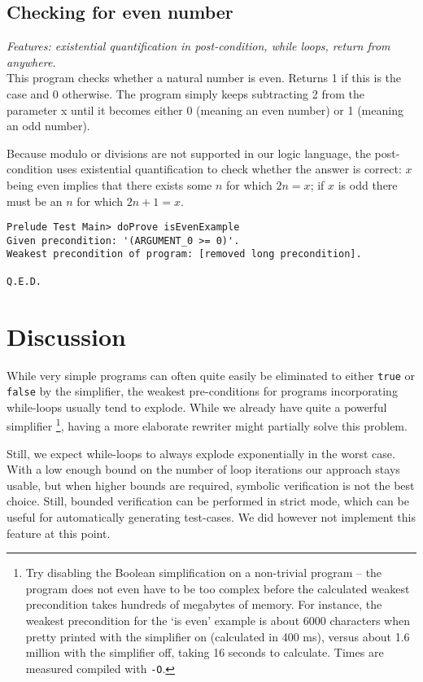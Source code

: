 \documentclass[a4paper]{article}
\begin{document}
\subsection{Checking for even number}
\textit{Features: existential quantification in post-condition, while loops, return from anywhere.}\\
This program checks whether a natural number is even. Returns 1 if this is the case and 0 otherwise. The program simply keeps subtracting 2 from the parameter x until it becomes either 0 (meaning an even number) or 1 (meaning an odd number).

Because modulo or divisions are not supported in our logic language, the post-condition uses existential quantification to check whether the answer is correct: $x$ being even implies that there exists some $n$ for which $2n = x$; if $x$ is odd there must be an $n$ for which $2n + 1 = x$.

\begin{verbatim}
Prelude Test Main> doProve isEvenExample
Given precondition: '(ARGUMENT_0 >= 0)'.
Weakest precondition of program: [removed long precondition].

Q.E.D.
\end{verbatim}

\section{Discussion}
While very simple programs can often quite easily be eliminated to either \texttt{true} or \texttt{false} by the simplifier, the weakest pre-conditions for programs incorporating while-loops usually tend to explode. While we already have quite a powerful simplifier \footnote{Try disabling the Boolean simplification on a non-trivial program -- the program does not even have to be too complex before the calculated weakest precondition takes hundreds of megabytes of memory. For instance, the weakest precondition for the `is even' example is about 6000 characters when pretty printed with the simplifier on (calculated in 400 ms), versus about 1.6 million with the simplifier off, taking 16 seconds to calculate. Times are measured compiled with \texttt{-O}.}, having a more elaborate rewriter might partially solve this problem.

Still, we expect while-loops to always explode exponentially in the worst case. With a low enough bound on the number of loop iterations our approach stays usable, but when higher bounds are required, symbolic verification is not the best choice. Still, bounded verification can be performed in strict mode, which can be useful for automatically generating test-cases. We did however not implement this feature at this point.
\end{document}
